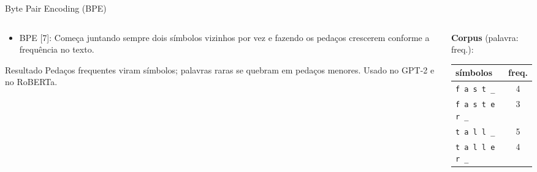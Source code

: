 \begin{frame}{Byte Pair Encoding (BPE)}
    \begin{columns}[T, onlytextwidth]
        \begin{column}{0.40\textwidth}
            \footnotesize
            \begin{itemize}
                \item BPE [7]: Começa juntando sempre dois símbolos vizinhos por vez e fazendo os pedaços crescerem conforme a frequência no texto.
            \end{itemize}
            
            \vspace{0.1em}
            
            \begin{exampleblock}{Resultado}
                \scriptsize
                Pedaços frequentes viram símbolos; palavras raras se quebram em pedaços menores. Usado no GPT-2 e no RoBERTa.
            \end{exampleblock}
        \end{column}
        
        \begin{column}{0.58\textwidth}
            \begin{columns}[T, onlytextwidth]
                \begin{column}{0.44\textwidth}
                    {\footnotesize \textbf{Corpus} (palavra: freq.):}
                    \vspace{0.2em}
                    
                    \scriptsize
                    \setlength{\tabcolsep}{3.5pt}
                    \begin{tabular}{lc}
                        \toprule
                        símbolos & freq. \\
                        \midrule
                        \texttt{f a s t \_} & 4 \\
                        \texttt{f a s t e r \_} & 3 \\
                        \texttt{t a l l \_} & 5 \\
                        \texttt{t a l l e r \_} & 4 \\
                        \bottomrule
                    \end{tabular}
                \end{column}
                

\end{columns}
\end{column}
\end{columns}
\end{frame}

